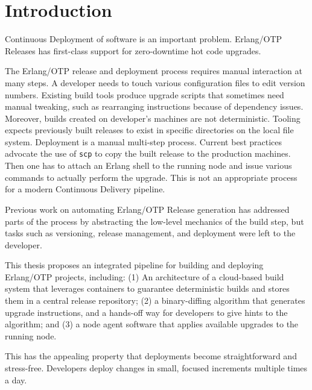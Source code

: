 \section{Introduction}



Continuous Deployment of software is an important problem.
Erlang/OTP Releases has first-class support for zero-downtime hot code upgrades.


The Erlang/OTP release and deployment process requires manual interaction at many steps.
A developer needs to touch various configuration files to edit version numbers.
Existing build tools produce upgrade scripts that sometimes need manual tweaking, such as rearranging instructions because of dependency issues.
Moreover, builds created on developer's machines are not deterministic. Tooling expects previously built releases to exist in specific directories on the local file system.
Deployment is a manual multi-step process. Current best practices advocate the use of \lstinline{scp} to copy the built release to the production machines. Then one has to attach an Erlang shell to the running node and issue various commands to actually perform the upgrade. This is not an appropriate process for a modern Continuous Delivery pipeline.


Previous work on automating Erlang/OTP Release generation has addressed parts of the process by abstracting the low-level mechanics of the build step, but tasks such as versioning, release management, and deployment were left to the developer.


This thesis proposes an integrated pipeline for building and deploying Erlang/OTP projects, including: (1) An architecture of a cloud-based build system that leverages containers to guarantee deterministic builds and stores them in a central release repository; (2) a binary-diffing algorithm that generates upgrade instructions, and a hands-off way for developers to give hints to the algorithm; and (3) a node agent software that applies available upgrades to the running node.


This has the appealing property that deployments become straightforward and stress-free. Developers deploy changes in small, focused increments  multiple times a day.
